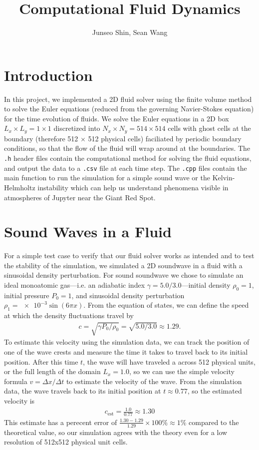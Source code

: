 \documentclass{article}
\author{Junseo Shin, Sean Wang}
\date{}
\title{Computational Fluid Dynamics}
\begin{document}
\maketitle

% 

\section*{Introduction}
In this project, we implemented a 2D fluid solver using the finite volume method to solve the Euler equations (reduced from the governing Navier-Stokes equation) for the time evolution of fluids.
We solve the Euler equations in a 2D box $L_x \times L_y = 1 \times 1$ discretized into $N_x \times N_y = 514 \times 514$ cells with ghost cells at the boundary (therefore 512 $\times$ 512 physical cells)
faciliated by periodic boundary conditions, so that the flow of the fluid will wrap around at the boundaries. The \texttt{.h} header files contain the computational method for solving the fluid equations,
and output the data to a \texttt{.csv} file at each time step. The \texttt{.cpp} files contain the main function to run the simulation for a simple sound wave or the Kelvin-Helmholtz instability which
can help us understand phenomena visible in atmospheres of Jupyter near the Giant Red Spot.

\section*{Sound Waves in a Fluid}
For a simple test case to verify that our fluid solver works as intended and to test the stability of the simulation,
we simulated a 2D soundwave in a fluid with a sinusoidal density perturbation.
For sound soundwave we chose to simulate an ideal monoatomic gas---i.e. an adiabatic index $\gamma = 5.0 / 3.0$---initial density $\rho_0 = 1$, initial pressure $P_0 = 1$,
and sinusoidal density perturbation $\rho_1 = \num{e-3} \sin(6\pi x)$. 
From the equation of states, we can define the speed at which the density fluctuations travel by
\begin{align*}
    c = \sqrt{\gamma P_0 / \rho_0} = \sqrt{5.0 / 3.0} \approx 1.29.
\end{align*}
To estimate this velocity using the simulation data, we can track the position of one of the wave crests and measure
the time it takes to travel back to its initial position.
After this time $t$, the wave will have traveled a across 512 physical units, or the full length of the domain $L_x = 1.0$,
so we can use the simple velocity formula $v = \Delta x / \Delta t$ to estimate the velocity of the wave.
From the simulation data, the wave travels back to its initial position at $t \approx 0.77$, so the estimated velocity is
\begin{align*}
    c_{\text{est}} = \frac{1.0}{0.77} \approx 1.30
\end{align*}
This estimate has a perecent error of $\frac{1.30 - 1.29}{1.29} \times 100\% \approx 1\%$ compared to the theoretical value,
so our simulation agrees with the theory even for a low resolution of 512x512 physical unit cells.
\end{document}
